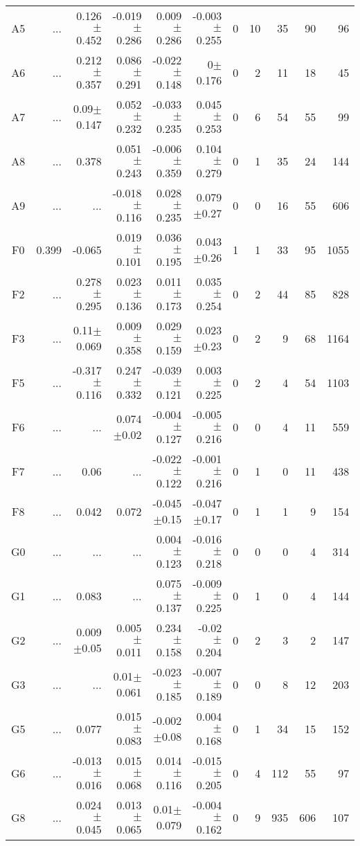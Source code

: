 \begin{table}[t]
\begin{center}
\begin{tabular}{c|rrrrr|rrrrr}
A5	&	 ...	&	0.126$\pm$0.452	&	-0.019$\pm$0.286	&	0.009$\pm$0.286	&	-0.003$\pm$0.255	&	0	&	10	&	35	&	90	&	96	\\
A6	&	 ...	&	0.212$\pm$0.357	&	0.086$\pm$0.291	&	-0.022$\pm$0.148	&	0$\pm$0.176	&	0	&	2	&	11	&	18	&	45	\\
A7	&	 ...	&	0.09$\pm$0.147	&	0.052$\pm$0.232	&	-0.033$\pm$0.235	&	0.045$\pm$0.253	&	0	&	6	&	54	&	55	&	99	\\
A8	&	 ...	&	0.378	&	0.051$\pm$0.243	&	-0.006$\pm$0.359	&	0.104$\pm$0.279	&	0	&	1	&	35	&	24	&	144	\\
A9	&	 ...	&	 ...	&	-0.018$\pm$0.116	&	0.028$\pm$0.235	&	0.079$\pm$0.27	&	0	&	0	&	16	&	55	&	606	\\
F0	&	0.399	&	-0.065	&	0.019$\pm$0.101	&	0.036$\pm$0.195	&	0.043$\pm$0.26	&	1	&	1	&	33	&	95	&	1055	\\
F2	&	 ...	&	0.278$\pm$0.295	&	0.023$\pm$0.136	&	0.011$\pm$0.173	&	0.035$\pm$0.254	&	0	&	2	&	44	&	85	&	828	\\
F3	&	 ...	&	0.11$\pm$0.069	&	0.009$\pm$0.358	&	0.029$\pm$0.159	&	0.023$\pm$0.23	&	0	&	2	&	9	&	68	&	1164	\\
F5	&	 ...	&	-0.317$\pm$0.116	&	0.247$\pm$0.332	&	-0.039$\pm$0.121	&	0.003$\pm$0.225	&	0	&	2	&	4	&	54	&	1103	\\
F6	&	 ...	&	 ...	&	0.074$\pm$0.02	&	-0.004$\pm$0.127	&	-0.005$\pm$0.216	&	0	&	0	&	4	&	11	&	559	\\
F7	&	 ...	&	0.06	&	 ...	&	-0.022$\pm$0.122	&	-0.001$\pm$0.216	&	0	&	1	&	0	&	11	&	438	\\
F8	&	 ...	&	0.042	&	0.072	&	-0.045$\pm$0.15	&	-0.047$\pm$0.17	&	0	&	1	&	1	&	9	&	154	\\
G0	&	 ...	&	 ...	&	 ...	&	0.004$\pm$0.123	&	-0.016$\pm$0.218	&	0	&	0	&	0	&	4	&	314	\\
G1	&	 ...	&	0.083	&	 ...	&	0.075$\pm$0.137	&	-0.009$\pm$0.225	&	0	&	1	&	0	&	4	&	144	\\
G2	&	 ...	&	0.009$\pm$0.05	&	0.005$\pm$0.011	&	0.234$\pm$0.158	&	-0.02$\pm$0.204	&	0	&	2	&	3	&	2	&	147	\\
G3	&	 ...	&	 ...	&	0.01$\pm$0.061	&	-0.023$\pm$0.185	&	-0.007$\pm$0.189	&	0	&	0	&	8	&	12	&	203	\\
G5	&	 ...	&	0.077	&	0.015$\pm$0.083	&	-0.002$\pm$0.08	&	0.004$\pm$0.168	&	0	&	1	&	34	&	15	&	152	\\
G6	&	 ...	&	-0.013$\pm$0.016	&	0.015$\pm$0.068	&	0.014$\pm$0.116	&	-0.015$\pm$0.205	&	0	&	4	&	112	&	55	&	97	\\
G8	&	 ...	&	0.024$\pm$0.045	&	0.013$\pm$0.065	&	0.01$\pm$0.079	&	-0.004$\pm$0.162	&	0	&	9	&	935	&	606	&	107	\\

\end{tabular}
\end{center}
\end{table}
